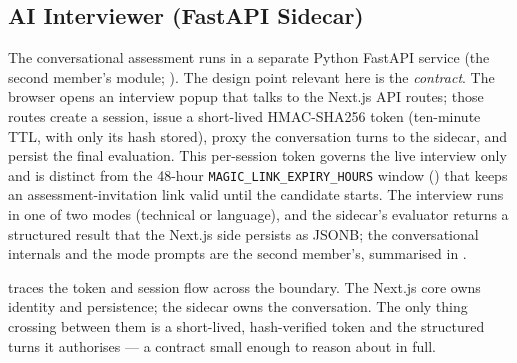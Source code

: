 \subsection{AI Interviewer (FastAPI Sidecar)}
\label{sec:design-interviewer}

The conversational assessment runs in a separate Python FastAPI service (the
second member's module; ). The design point relevant here is
the \emph{contract}. The browser opens an interview popup that talks to the
Next.js API routes; those routes create a session, issue a short-lived
HMAC-SHA256 token (ten-minute TTL, with only its hash stored), proxy the
conversation turns to the sidecar, and persist the final evaluation. This
per-session token governs the live interview only and is distinct from the
48-hour \texttt{MAGIC\_LINK\_EXPIRY\_HOURS} window ()
that keeps an assessment-invitation link valid until the candidate starts. The
interview runs in one of two modes (technical or language), and the sidecar's
evaluator returns a structured result that the Next.js side persists as JSONB;
the conversational internals and the mode prompts are the second member's,
summarised in .

 traces the token and session flow across the
boundary. The Next.js core owns identity and persistence; the sidecar owns the
conversation. The only thing crossing between them is a short-lived,
hash-verified token and the structured turns it authorises --- a contract
small enough to reason about in full.

